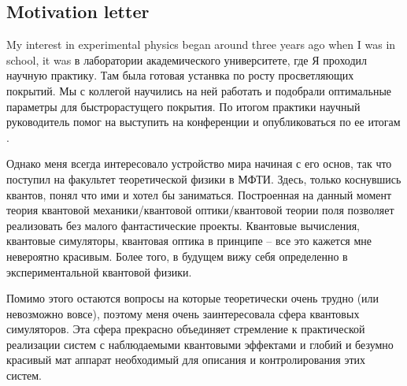





\subsection*{Motivation letter}


My interest in experimental physics began around three years ago when I 
was in school, it was в лаборатории академического университете, где Я проходил научную практику. Там была готовая устанвка по росту просветляющих покрытий. Мы с коллегой научились на ней работать и подобрали оптимальные параметры для быстрорастущего покрытия. По итогом практики научный руководитель помог на выступить на конференции и опубликоваться по ее итогам .


Однако меня всегда интересовало устройство мира начиная с его основ, так что поступил на факультет теоретической физики в МФТИ. Здесь, только коснувшись квантов, понял что ими и хотел бы заниматься. Построенная на данный момент теория квантовой механики/квантовой оптики/квантовой теории поля позволяет реализовать без малого фантастические проекты. 
Квантовые вычисления, квантовые симуляторы, квантовая оптика в принципе -- все это кажется мне невероятно красивым. Более того, в будущем вижу себя определенно в экспериментальной квантовой физики. 







Помимо этого остаются вопросы на которые теоретически очень трудно (или невозможно вовсе), поэтому меня очень заинтересовала сфера квантовых симуляторов. Эта сфера прекрасно объединяет стремление к практической реализации систем с наблюдаемыми квантовыми эффектами и глобий и безумно красивый мат аппарат необходимый для описания и контролирования этих систем. 





